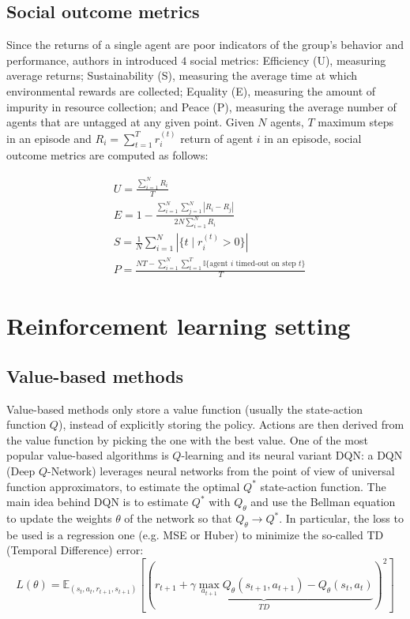 \documentclass{article}
\begin{document}
\subsection{Social outcome metrics}
Since the returns of a single agent are poor indicators of the group's behavior and performance, authors in \cite{harvest} introduced $4$ social metrics: Efficiency (U), measuring average returns; Sustainability (S), measuring the average time at which environmental rewards are collected; Equality (E), measuring the amount of impurity in resource collection; and Peace (P), measuring the average number of agents that are untagged at any given point. Given $N$ agents, $T$ maximum steps in an episode and $R_i=\sum_{t=1}^T r_i^{(t)}$ return of agent $i$ in an episode, social outcome metrics are computed as follows:

\begin{equation}
  \label{eq:metrics}
  \begin{aligned}
    & U = \frac{\sum_{i=1}^N R_i}{T}\\
    & E = 1 - \frac{\sum_{i=1}^N\sum_{j=1}^N |R_i-R_j|}{2N\sum_{i=1}^N R_i} \\
    & S = \frac{1}{N}\sum_{i=1}^N |\{t\mid r_i^{(t)}>0\}| \\
    & P = \frac{NT-\sum_{i=1}^N\sum_{t=1}^T \mathbb{I}\{\text{agent } i \text{ timed-out on step } t\}}{T}
  \end{aligned}
\end{equation}

\section{Reinforcement learning setting}

\subsection{Value-based methods}
Value-based methods only store a value function (usually the state-action function $Q$), instead of explicitly storing the policy. Actions are then derived from the value function by picking the one with the best value. One of the most popular value-based algorithms is $Q$-learning and its neural variant DQN: a DQN (Deep $Q$-Network) \cite{dqn} leverages neural networks from the point of view of universal function approximators, to estimate the optimal $Q^*$ state-action function. The main idea behind DQN is to estimate $Q^*$ with $Q_\theta$ and use the Bellman equation to update the weights $\theta$ of the network so that $Q_\theta\rightarrow Q^*$. In particular, the loss to be used is a regression one (e.g. MSE or Huber) to minimize the so-called TD (Temporal Difference) error:
$$
L(\theta)=\mathbb{E}_{(s_t,a_t,r_{t+1},s_{t+1})}\left[\left(\underbrace{r_{t+1}+\gamma\max_{a_{t+1}}Q_\theta(s_{t+1}, a_{t+1}) - Q_\theta(s_t, a_t)}_{TD}\right)^2\right]
$$
\end{document}
